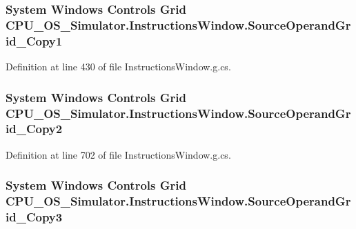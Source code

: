 \subsubsection[{Source\+Operand\+Grid\+\_\+\+Copy1}]{\setlength{\rightskip}{0pt plus 5cm}System Windows Controls Grid C\+P\+U\+\_\+\+O\+S\+\_\+\+Simulator.\+Instructions\+Window.\+Source\+Operand\+Grid\+\_\+\+Copy1\hspace{0.3cm}{\ttfamily [package]}}\label{class_c_p_u___o_s___simulator_1_1_instructions_window_a685393ff28189e8c998e2a7dc6018b32}


Definition at line 430 of file Instructions\+Window.\+g.\+cs.

\hypertarget{class_c_p_u___o_s___simulator_1_1_instructions_window_a6a57e0ae92b85cd619ef3d879ef0c628}{}
\subsubsection[{Source\+Operand\+Grid\+\_\+\+Copy2}]{\setlength{\rightskip}{0pt plus 5cm}System Windows Controls Grid C\+P\+U\+\_\+\+O\+S\+\_\+\+Simulator.\+Instructions\+Window.\+Source\+Operand\+Grid\+\_\+\+Copy2\hspace{0.3cm}{\ttfamily [package]}}\label{class_c_p_u___o_s___simulator_1_1_instructions_window_a6a57e0ae92b85cd619ef3d879ef0c628}


Definition at line 702 of file Instructions\+Window.\+g.\+cs.

\hypertarget{class_c_p_u___o_s___simulator_1_1_instructions_window_ac37123264ae139f4abc30841da21cd23}{}
\subsubsection[{Source\+Operand\+Grid\+\_\+\+Copy3}]{\setlength{\rightskip}{0pt plus 5cm}System Windows Controls Grid C\+P\+U\+\_\+\+O\+S\+\_\+\+Simulator.\+Instructions\+Window.\+Source\+Operand\+Grid\+\_\+\+Copy3\hspace{0.3cm}{\ttfamily [package]}}\label{class_c_p_u___o_s___simulator_1_1_instructions_window_ac37123264ae139f4abc30841da21cd23}



